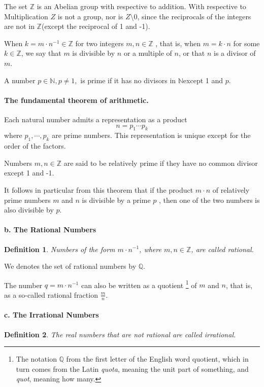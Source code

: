 \documentclass[a4paper,12pt]{article} %
\newtheorem{definition}{Definition}[section]
\begin{document}
The set $\mathbb{Z}$  is an Abelian group with respective to addition.
With respective to Multiplication $Z$ is not a group, nor is $Z\setminus 0$, 
since the reciprocals of the integers are not in $\mathbb{Z} $(except 
the reciprocal of 1 and -1).

When $k=m\cdot n^{-1}\in\mathbb{Z}$ for two integers $m,n\in\mathbb{Z}$ ,
that is, when $m=k\cdot n$ for some $k\in \mathbb{Z} $, we say that 
$m$ is divisible by $n$ or a multiple of $n$, or that $n$ is a divisor 
of $m$.

A number $p\in \mathbb{N},p\ne 1,$ is prime if it has no divisors in 
$\mathbb{N} $except 1 and $p$.

\paragraph{The fundamental theorem of arithmetic.} Each natural number 
admits a representation as a product 
\[n=p_1\cdots p_k\]
where $p_1,\cdots,p_k$ are prime numbers. This representation is unique
except for the order of the factors.

Numbers $m,n\in \mathbb{Z}$ are said to be relatively prime if they 
have no common divisor except 1 and -1.

It follows in particular from this theorem that if the product $m\cdot n$
of relatively prime numbers $m$ and $n$ is divisible by a prime $p$ ,
then one of the two numbers is also divisible by $p$.

\paragraph{b. The Rational Numbers}
\begin{definition}
    Numbers of the form $m\cdot n^{-1}$, where $m,n\in \mathbb{Z}$, are called 
    rational.
\end{definition}

We denotes the set of rational numbers by $\mathbb{Q}$.

The number $q=m\cdot n^{-1}$ can also be written as a quotient 
\footnote{The notation $\mathbb{Q}$ from the first letter of the English 
word quotient, which in turn comes from the Latin \textit{quota}, meaning 
the unit part of something, and \textit{quot}, meaning how many.} 
of $m$ and $n$, that is, as a so-called rational fraction $\displaystyle \frac{m}{n}.$
\paragraph{c. The Irrational Numbers}
\begin{definition}
    The real numbers that are not rational are called irrational.
\end{definition}
\end{document}
